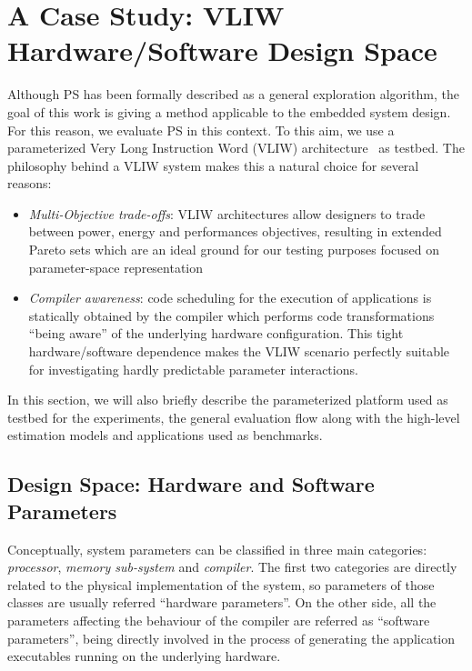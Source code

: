 \section{A Case Study: VLIW Hardware/Software Design Space}
Although PS has been formally described as a general exploration algorithm, the goal of this work is giving a method applicable to the embedded system design. For this reason, we evaluate PS in this context. To this aim, we use a parameterized Very Long Instruction
Word (VLIW) architecture~\cite{kathail_tr00} as testbed. The philosophy
behind a VLIW system makes this a natural choice for several reasons:
\begin{itemize}
\item \emph{Multi-Objective trade-offs}: VLIW architectures allow designers
to trade between power, energy and performances objectives, resulting
in extended Pareto sets which are an ideal ground for our testing
purposes focused on parameter-space representation
\item \emph{Compiler awareness}: code scheduling for the execution of
applications is statically obtained by the compiler which
performs code transformations ``being aware'' of the underlying hardware
configuration.  This tight hardware/software dependence makes the
VLIW scenario perfectly suitable for investigating hardly predictable
parameter interactions.
\end{itemize}

In this section, we will also briefly describe the parameterized platform used
as testbed for the experiments, the general evaluation flow along with
the high-level estimation models and applications used as benchmarks.

\subsection{Design Space: Hardware and Software Parameters}
Conceptually, system parameters can be classified in three main categories:
\emph{processor}, \emph{memory sub-system} and \emph{compiler}. The
first two categories are directly related to the physical
implementation of the system, so parameters of those
classes are usually referred ``hardware parameters''. On the other
side, all the parameters affecting the behaviour of the compiler
are referred as ``software parameters'', being directly involved in
the process of generating the application executables running on the
underlying hardware.

